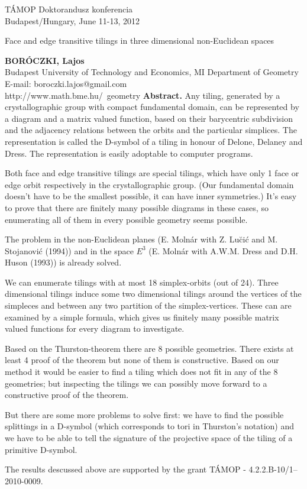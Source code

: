 \documentclass[a4paper]{article}
\begin{document}
\small
TÁMOP Doktorandusz konferencia\\
Budapest/Hungary, June 11-13, 2012
\vfill
\large
\begin{center} 
  Face and edge transitive tilings in three dimensional non-Euclidean spaces
\end{center}
\vfill
\small
\textbf{BORÓCZKI, Lajos}\\
Budapest University of Technology and Economics, MI Department of Geometry\\
E-mail: boroczki.lajos@gmail.com\\
http://www.math.bme.hu/~geometry
\vfill
\small
\textbf{Abstract.} Any tiling, generated by a crystallographic group with
compact fundamental domain, can be represented by a diagram and a matrix valued
function, based on their barycentric subdivision and the adjacency relations
between the orbits and the particular simplices. The representation is called
the D-symbol of a tiling in honour of Delone, Delaney and Dress. The
representation is easily adoptable to computer programs.

Both face and edge transitive tilings are special tilings, which have only 1
face or edge orbit respectively in the crystallographic group. (Our fundamental
domain doesn't have to be the smallest possible, it can have inner symmetries.)
It's easy to prove that there are finitely many possible diagrams in these
cases, so enumerating all of them in every possible geometry seems possible.

The problem in the non-Euclidean planes (E. Molnár with  Z.  Lu\u{c}i\'{c} and
M. Stojanovi\'{c} (1994)) and in the space $E^3$ (E. Molnár with A.W.M. Dress
and D.H. Huson (1993)) is already solved.

We can enumerate tilings with at most 18 simplex-orbits (out of 24). Three
dimensional tilings induce some two dimensional tilings around the vertices of
the simpleces and between any two partition of the simplex-vertices. These can
are examined by a simple formula, which gives us finitely many possible matrix
valued functions for every diagram to investigate.

Based on the Thurston-theorem there are 8 possible geometries.  There exists at
least 4 proof of the theorem but none of them is constructive. Based on our
method it would be easier to find a tiling which does not fit in any of the 8
geometries; but inspecting the tilings we can possibly move forward to a
constructive proof of the theorem.

But there are some more problems to solve first: we have to find the possible
splittings in a D-symbol (which corresponds to tori in Thurston's notation)
and we have to be able to tell the signature of the projective space of the
tiling of a primitive D-symbol.

The results descussed above are supported by the grant TÁMOP -
4.2.2.B-10/1--2010-0009.
\vfill
\vfill
\end{document}
